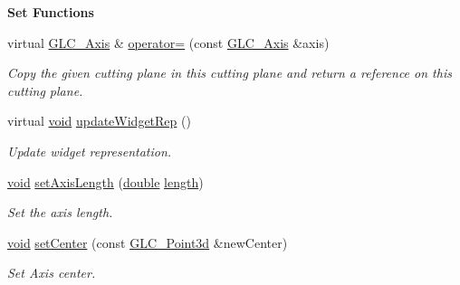 \begin{Indent}{\bf Set Functions}\par
\begin{DoxyCompactItemize}
\item 
virtual \hyperlink{class_g_l_c___axis}{G\-L\-C\-\_\-\-Axis} \& \hyperlink{class_g_l_c___axis_ae1cfb66a74885526e11477a6a6529c57}{operator=} (const \hyperlink{class_g_l_c___axis}{G\-L\-C\-\_\-\-Axis} \&axis)
\begin{DoxyCompactList}\small\item\em Copy the given cutting plane in this cutting plane and return a reference on this cutting plane. \end{DoxyCompactList}\item 
virtual \hyperlink{group___u_a_v_objects_plugin_ga444cf2ff3f0ecbe028adce838d373f5c}{void} \hyperlink{class_g_l_c___axis_a5afd593d9a502df907dcf0de3e05f252}{update\-Widget\-Rep} ()
\begin{DoxyCompactList}\small\item\em Update widget representation. \end{DoxyCompactList}\item 
\hyperlink{group___u_a_v_objects_plugin_ga444cf2ff3f0ecbe028adce838d373f5c}{void} \hyperlink{class_g_l_c___axis_ad1554731885ba60340f1660fc1167e43}{set\-Axis\-Length} (\hyperlink{_super_l_u_support_8h_a8956b2b9f49bf918deed98379d159ca7}{double} \hyperlink{glext_8h_a3c8469415bbc83dd1341af15c67f1cef}{length})
\begin{DoxyCompactList}\small\item\em Set the axis length. \end{DoxyCompactList}\item 
\hyperlink{group___u_a_v_objects_plugin_ga444cf2ff3f0ecbe028adce838d373f5c}{void} \hyperlink{class_g_l_c___axis_a4949e33f8ea9f55019284f70e0e86231}{set\-Center} (const \hyperlink{glc__vector3d_8h_a4e13a9bbc7ab3d34de7e98b41836772c}{G\-L\-C\-\_\-\-Point3d} \&new\-Center)
\begin{DoxyCompactList}\small\item\em Set Axis center. \end{DoxyCompactList}\end{DoxyCompactItemize}
\end{Indent}
